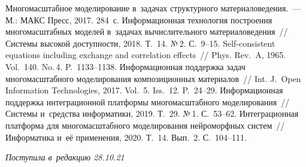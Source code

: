 \begin{multicols}{2}
{{\begin{thebibliography}{9}
 Многомасштабное моделирование в~задачах структурного 
материаловедения.~--- М.: МАКС Пресс, 2017. 284~с.
 Информационная технология по\-стро\-ения многомасштабных моделей 
в~задачах вычислительного материаловедения~// Сис\-те\-мы высокой до\-ступ\-ности, 2018. Т.~14. 
№\,2. С.~9--15.
 Self-consistent equations including exchange and correlation effects~// 
Phys. Rev.~A, 1965. Vol.~140. No.\,4. P.~1133--1138.
 Информационная поддержка задач 
многомасштабного моделирования композиционных материалов~// Int. J.~Open Information 
Technologies, 2017. Vol.~5. Iss.~12. P.~24--29.
 Информационная поддержка интеграционной 
платформы многомасштабного моделирования~// Системы и~средства информатики, 2019. 
Т.~29. №\,1. С.~53--62.
 Интеграционная платформа для многомасштабного 
моделирования нейроморфных сис\-тем~// Информатика и~её применения, 2020. Т.~14. 
Вып.~2. С.~104--111. 
\end{thebibliography}

 }
 }

\end{multicols}

\vspace*{-6pt}

\hfill{\small\textit{Поступила в~редакцию 28.10.21}}



\newpage

\vspace*{-28pt}





\def\tit{DISTRIBUTED INFORMATION SYSTEM FOR~CALCULATING THE~STRUCTURAL 
PROPERTIES OF~COMPOSITE MATERIALS}


\def\titkol{Distributed information system for calculating the structural 
properties of~composite materials}


\def\aut{K.\,K.~Abgaryan$^{1,2}$ and~E.\,S.~Gavrilov$^{1,2}$}

\def\autkol{K.\,K.~Abgaryan and~E.\,S.~Gavrilov}

